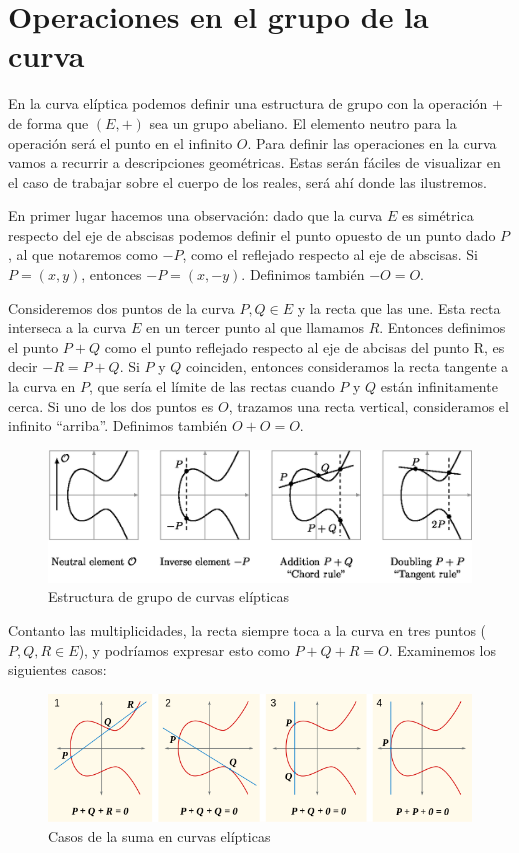 \documentclass{article}
\begin{document}
\section{Operaciones en el grupo de la curva}

En la curva elíptica podemos definir una estructura de grupo con la
operación $+$ de forma que $(E, +)$ sea un grupo abeliano. El elemento
neutro para la operación será el punto en el infinito $O$. Para
definir las operaciones en la curva vamos a recurrir a descripciones
geométricas. Estas serán fáciles de visualizar en el caso de trabajar
sobre el cuerpo de los reales, será ahí donde las ilustremos.

En primer lugar hacemos una observación: dado que la curva
$E$ es simétrica respecto del eje de abscisas podemos definir el punto
opuesto de un punto dado $P$, al que notaremos como $-P$, como el
reflejado respecto al eje de abscisas. Si $P=(x,y)$, entonces
$-P=(x,-y)$. Definimos también $-O=O$.

Consideremos dos puntos de la curva $P,Q\in E$ y la recta que las
une. Esta recta interseca a la curva $E$ en un tercer punto al que
llamamos $R$. Entonces definimos el punto $P+Q$ como el punto
reflejado respecto al eje de abcisas del punto R, es decir $-R =
P+Q$. Si $P$ y $Q$ coinciden, entonces consideramos la recta tangente
a la curva en $P$, que sería el límite de las rectas cuando $P$ y $Q$
están infinitamente cerca. Si uno de los dos puntos es $O$, trazamos
una recta vertical, consideramos el infinito “arriba”. Definimos
también $O+O=O$.

\begin{figure}[H]
  \centering
  \includegraphics[width=170mm]{imagenes/operaciones}
  \caption{Estructura de grupo de curvas elípticas}
\end{figure}

Contanto las multiplicidades, la recta siempre toca a la curva en tres
puntos ($P,Q,R\in E$), y podríamos expresar esto como
$P+Q+R=O$. Examinemos los siguientes casos:

\begin{figure}[H]
  \centering
  \includegraphics[width=170mm]{imagenes/suma}
  \caption{Casos de la suma en curvas elípticas}
\end{figure}
\end{document}
